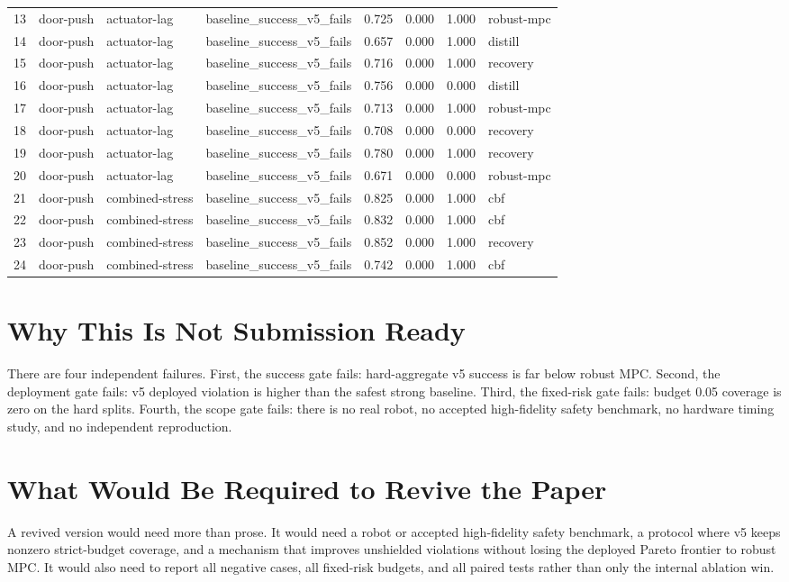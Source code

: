 \documentclass{article}
\begin{document}
\begin{longtable}{@{}rlllrrrl@{}}
13 & door-push & actuator-lag & baseline\_success\_v5\_fails & 0.725 & 0.000 & 1.000 & robust-mpc \\
14 & door-push & actuator-lag & baseline\_success\_v5\_fails & 0.657 & 0.000 & 1.000 & distill \\
15 & door-push & actuator-lag & baseline\_success\_v5\_fails & 0.716 & 0.000 & 1.000 & recovery \\
16 & door-push & actuator-lag & baseline\_success\_v5\_fails & 0.756 & 0.000 & 0.000 & distill \\
17 & door-push & actuator-lag & baseline\_success\_v5\_fails & 0.713 & 0.000 & 1.000 & robust-mpc \\
18 & door-push & actuator-lag & baseline\_success\_v5\_fails & 0.708 & 0.000 & 0.000 & recovery \\
19 & door-push & actuator-lag & baseline\_success\_v5\_fails & 0.780 & 0.000 & 1.000 & recovery \\
20 & door-push & actuator-lag & baseline\_success\_v5\_fails & 0.671 & 0.000 & 0.000 & robust-mpc \\
21 & door-push & combined-stress & baseline\_success\_v5\_fails & 0.825 & 0.000 & 1.000 & cbf \\
22 & door-push & combined-stress & baseline\_success\_v5\_fails & 0.832 & 0.000 & 1.000 & cbf \\
23 & door-push & combined-stress & baseline\_success\_v5\_fails & 0.852 & 0.000 & 1.000 & recovery \\
24 & door-push & combined-stress & baseline\_success\_v5\_fails & 0.742 & 0.000 & 1.000 & cbf \\
\bottomrule
\end{longtable}
\endgroup


\section{Why This Is Not Submission Ready}
There are four independent failures. First, the success gate fails: hard-aggregate v5 success is far below robust MPC. Second, the deployment gate fails: v5 deployed violation is higher than the safest strong baseline. Third, the fixed-risk gate fails: budget 0.05 coverage is zero on the hard splits. Fourth, the scope gate fails: there is no real robot, no accepted high-fidelity safety benchmark, no hardware timing study, and no independent reproduction.

\section{What Would Be Required to Revive the Paper}
A revived version would need more than prose. It would need a robot or accepted high-fidelity safety benchmark, a protocol where v5 keeps nonzero strict-budget coverage, and a mechanism that improves unshielded violations without losing the deployed Pareto frontier to robust MPC. It would also need to report all negative cases, all fixed-risk budgets, and all paired tests rather than only the internal ablation win.
\end{document}
